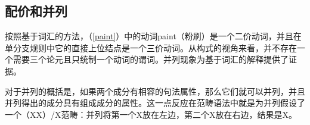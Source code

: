 \subsection{配价和并列}
\label{coordination-sec}
    按照基于词汇的方法，（\ref{paint}）中的动词paint（粉刷）是一个二价动词，并且在单分支规则中它的直接上位结点是一个三价动词。从构式的视角来看，并不存在一个需要三个论元且只统制一个动词的谓词。并列现象为基于词汇的解释提供了证据。

    对于并列的概括是，如果两个成分有相容的句法属性，那么它们就可以并列，并且并列得出的成分具有组成成分的属性。这一点反应在范畴语法中就是为并列假设了一个（X\bs X）/X范畴：并列将第一个X放在左边，第二个X放在右边，结果是X。


